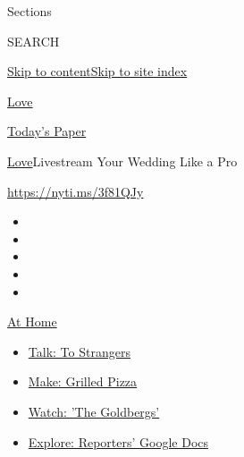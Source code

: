 Sections

SEARCH

\protect\hyperlink{site-content}{Skip to
content}\protect\hyperlink{site-index}{Skip to site index}

\href{https://www.nytimes3xbfgragh.onion/section/fashion/weddings}{Love}

\href{https://myaccount.nytimes3xbfgragh.onion/auth/login?response_type=cookie\&client_id=vi}{}

\href{https://www.nytimes3xbfgragh.onion/section/todayspaper}{Today's
Paper}

\href{/section/fashion/weddings}{Love}\textbar{}Livestream Your Wedding
Like a Pro

\href{https://nyti.ms/3f81QJy}{https://nyti.ms/3f81QJy}

\begin{itemize}
\item
\item
\item
\item
\item
\end{itemize}

\href{https://www.nytimes3xbfgragh.onion/spotlight/at-home?action=click\&pgtype=Article\&state=default\&region=TOP_BANNER\&context=at_home_menu}{At
Home}

\begin{itemize}
\tightlist
\item
  \href{https://www.nytimes3xbfgragh.onion/2020/08/03/well/family/the-benefits-of-talking-to-strangers.html?action=click\&pgtype=Article\&state=default\&region=TOP_BANNER\&context=at_home_menu}{Talk:
  To Strangers}
\item
  \href{https://www.nytimes3xbfgragh.onion/2020/08/01/at-home/coronavirus-make-pizza-on-a-grill.html?action=click\&pgtype=Article\&state=default\&region=TOP_BANNER\&context=at_home_menu}{Make:
  Grilled Pizza}
\item
  \href{https://www.nytimes3xbfgragh.onion/2020/07/31/arts/television/goldbergs-abc-stream.html?action=click\&pgtype=Article\&state=default\&region=TOP_BANNER\&context=at_home_menu}{Watch:
  'The Goldbergs'}
\item
  \href{https://www.nytimes3xbfgragh.onion/interactive/2020/at-home/even-more-reporters-editors-diaries-lists-recommendations.html?action=click\&pgtype=Article\&state=default\&region=TOP_BANNER\&context=at_home_menu}{Explore:
  Reporters' Google Docs}
\end{itemize}

